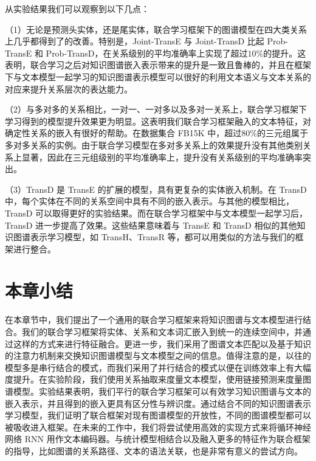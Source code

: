 从实验结果我们可以观察到以下几点：

（1）无论是预测头实体，还是尾实体，联合学习框架下的图谱模型在四大类关系上几乎都得到了的改善。特别是，Joint-TransE 与 Joint-TransD 比起 Prob-TransE 和 Prob-TransD，在关系级别的平均准确率上实现了超过$10\%$的提升。这表明，联合学习之后对知识图谱嵌入表示带来的提升是一致且鲁棒的，并且在框架下与文本模型一起学习的知识图谱表示模型可以很好的利用文本语义与文本关系的对应来提升关系层次的表达能力。

（2）与多对多的关系相比，一对一、一对多以及多对一关系上，联合学习框架下学习得到的模型提升效果更为明显。这表明我们联合学习框架融入的文本特征，对确定性关系的嵌入有很好的帮助。在数据集合 FB15K 中，超过$80\%$的三元组属于多对多关系的实例。由于联合学习模型在多对多关系上的效果提升没有其他类别关系上显著，因此在三元组级别的平均准确率上，提升没有关系级别的平均准确率突出。

（3）TransD 是 TransE 的扩展的模型，具有更复杂的实体嵌入机制。在 TransD 中，每个实体在不同的关系空间中具有不同的嵌入表示。与其他的模型相比，TransD 可以取得更好的实验结果。而在联合学习框架中与文本模型一起学习后，TransD 进一步提高了效果。这些结果意味着与 TransE 和 TransD 相似的其他知识图谱表示学习模型，如 TransH、TransR 等，都可以用类似的方法与我们的框架进行整合。

\section{本章小结}

在本章节中，我们提出了一个通用的联合学习框架来将知识图谱与文本模型进行结合。我们的联合学习框架将实体、关系和文本词汇嵌入到统一的连续空间中，并通过这样的方式来进行特征融合。更进一步，我们采用了图谱文本匹配以及基于知识的注意力机制来交换知识图谱模型与文本模型之间的信息。值得注意的是，以往的模型多是串行结合的模式，而我们采用了并行结合的模式以便在训练效率上有大幅度提升。在实验阶段，我们使用关系抽取来度量文本模型，使用链接预测来度量图谱模型。实验结果表明，我们平行的联合学习框架可以有效学习知识图谱与文本的嵌入表示，并且得到的嵌入更具有区分性与辨识度。通过结合不同的知识图谱表示学习模型，我们证明了联合框架对现有图谱模型的开放性，不同的图谱模型都可以被吸收进入框架。在未来的工作中，我们将尝试使用高效的实现方式来将循环神经网络 RNN 用作文本编码器。与统计模型相结合以及融入更多的特征作为联合框架的指导，比如图谱的关系路径、文本的语法关联，也是非常有意义的尝试方向。







